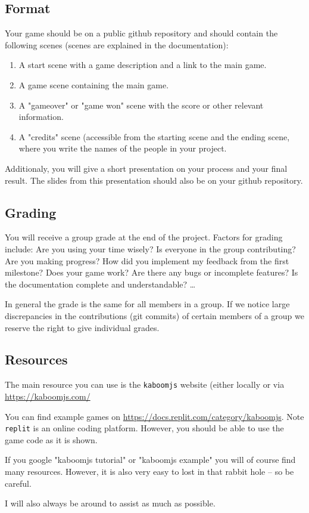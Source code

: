 \documentclass[11pt,a4paper]{report}
\begin{document}
\subsection{Format}
Your game should be on a public github repository and should contain the following scenes (scenes are explained in the documentation):
\begin{enumerate}
\item A start scene with a game description and a link to the main game.
\item A game scene containing the main game.
\item A "gameover" or "game won" scene with the score or other relevant information.
\item A "credits" scene (accessible from the starting scene and the ending scene, where you write the names of the people in your project.
\end{enumerate}

Additionaly, you will give a short presentation on your process and your final result. The slides from this presentation should also be on your github repository.



\subsection{Grading}
You will receive a group grade at the end of the project. Factors for grading include: Are you using your time wisely? Is everyone in the group contributing? Are you making progress? How did you implement my feedback from the first milestone? Does your game work? Are there any bugs or incomplete features? Is the documentation complete and understandable? \ldots

In general the grade is the same for all members in a group. If we notice large discrepancies in the contributions (git commits) of certain members of a group we reserve the right to give individual grades.

\subsection{Resources}
The main resource you can use is the \verb|kaboomjs| website (either locally or via \url{https://kaboomjs.com/}

You can find example games on \url{https://docs.replit.com/category/kaboomjs}. Note \verb|replit| is an online coding platform. However, you should be able to use the game code as it is shown.

If you google "kaboomjs tutorial" or "kaboomjs example" you will of course find many resources. However, it is also very easy to lost in that rabbit hole -- so be careful.

I will also always be around to assist as much as possible.
\end{document}
